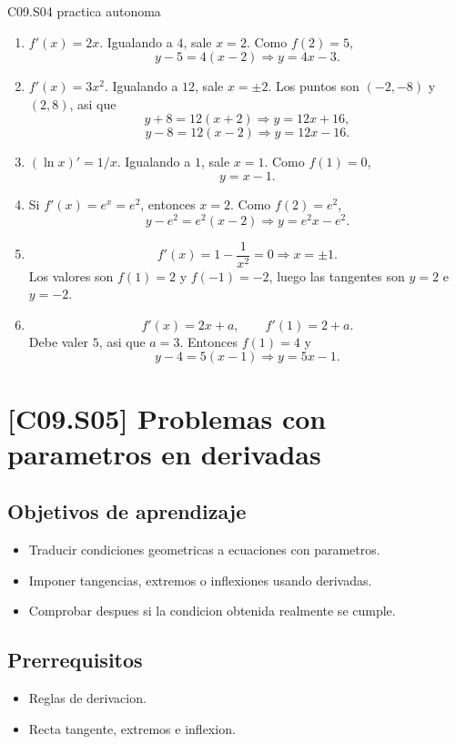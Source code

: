 \begin{fullsolution}{C09.S04 practica autonoma}
\begin{enumerate}[label=\textbf{PX-C09.S04-\arabic*:}, leftmargin=*]
  \item \(f'(x)=2x\). Igualando a \(4\), sale \(x=2\). Como \(f(2)=5\),
  \[
  y-5=4(x-2)\Longrightarrow y=4x-3.
  \]
  \item \(f'(x)=3x^2\). Igualando a \(12\), sale \(x=\pm 2\). Los puntos son \((-2,-8)\) y
  \((2,8)\), asi que
  \[
  y+8=12(x+2)\Longrightarrow y=12x+16,
  \]
  \[
  y-8=12(x-2)\Longrightarrow y=12x-16.
  \]
  \item \((\ln x)'=1/x\). Igualando a \(1\), sale \(x=1\). Como \(f(1)=0\),
  \[
  y=x-1.
  \]
  \item Si \(f'(x)=e^x=e^2\), entonces \(x=2\). Como \(f(2)=e^2\),
  \[
  y-e^2=e^2(x-2)\Longrightarrow y=e^2x-e^2.
  \]
  \item
  \[
  f'(x)=1-\frac{1}{x^2}=0 \Longrightarrow x=\pm 1.
  \]
  Los valores son \(f(1)=2\) y \(f(-1)=-2\), luego las tangentes son \(y=2\) e \(y=-2\).
  \item
  \[
  f'(x)=2x+a,\qquad f'(1)=2+a.
  \]
  Debe valer \(5\), asi que \(a=3\). Entonces \(f(1)=4\) y
  \[
  y-4=5(x-1)\Longrightarrow y=5x-1.
  \]
\end{enumerate}
\end{fullsolution}

\section{[C09.S05] Problemas con parametros en derivadas}

\subsection*{Objetivos de aprendizaje}
\begin{itemize}
  \item Traducir condiciones geometricas a ecuaciones con parametros.
  \item Imponer tangencias, extremos o inflexiones usando derivadas.
  \item Comprobar despues si la condicion obtenida realmente se cumple.
\end{itemize}

\subsection*{Prerrequisitos}
\begin{itemize}
  \item Reglas de derivacion.
  \item Recta tangente, extremos e inflexion.
\end{itemize}

